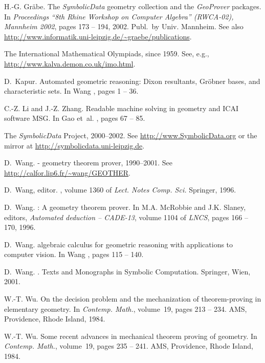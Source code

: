 \documentclass[11pt]{article}
\newcommand{\GP}{\textit{Geo\-Prover}}
\newcommand{\SD}{\textit{Symbolic\-Data}}
\begin{document}
\begin{thebibliography}{10}
H.-G. Gr\"abe.
\newblock The {\SD} geometry collection and the {\GP} packages.
\newblock In {\em Proceedings ``8th Rhine Workshop on Computer Algebra''
  (RWCA-02), Mannheim 2002}, pages 173 -- 194, 2002.
\newblock Publ.\ by Univ. Mannheim. \newblock See also
  \url{http://www.informatik.uni-leipzig.de/~graebe/publications}.

{The International Mathematical Olympiads}, since 1959.
\newblock See, e.g., \url{http://www.kalva.demon.co.uk/imo.html}.

D.~Kapur.
\newblock Automated geometric reasoning: {Dixon} resultants, {Gr\"obner} bases,
  and characteristic sets.
\newblock In Wang \cite{Proceedings/ADG-96}, pages 1 -- 36.

C.-Z. Li and J.-Z. Zhang.
\newblock Readable machine solving in geometry and {ICAI} software {MSG}.
\newblock In Gao et~al. \cite{Proceedings/ADG-98}, pages 67 -- 85.

{The {\SD} Project}, 2000--2002.
\newblock See \url{http://www.SymbolicData.org} or the mirror at
  \url{http://symbolicdata.uni-leipzig.de}.

D.~Wang.
 - geometry theorem prover, 1990--2001.
\newblock See \url{http://calfor.lip6.fr/~wang/GEOTHER}.

D.~Wang, editor.
, volume 1360 of
  {\em Lect. Notes Comp. Sci.} Springer, 1996.

D.~Wang.
: A geometry theorem prover.
\newblock In M.A. McRobbie and J.K. Slaney, editors, {\em Automated deduction
  -- CADE-13}, volume 1104 of {\em LNCS}, pages 166 -- 170, 1996.

D.~Wang.
 algebraic calculus for geometric reasoning with
  applications to computer vision.
\newblock In Wang \cite{Proceedings/ADG-96}, pages 115 -- 140.

D.~Wang.
.
\newblock Texts and Monographs in Symbolic Computation. Springer, Wien, 2001.

W.-T. Wu.
\newblock On the decision problem and the mechanization of theorem-proving in
  elementary geometry.
\newblock In {\em Contemp. Math.}, volume~19, pages 213 -- 234. AMS,
  Providence, Rhode Island, 1984.

W.-T. Wu.
\newblock Some recent advances in mechanical theorem proving of geometry.
\newblock In {\em Contemp. Math.}, volume~19, pages 235 -- 241. AMS,
  Providence, Rhode Island, 1984.


\end{thebibliography}
\end{document}
